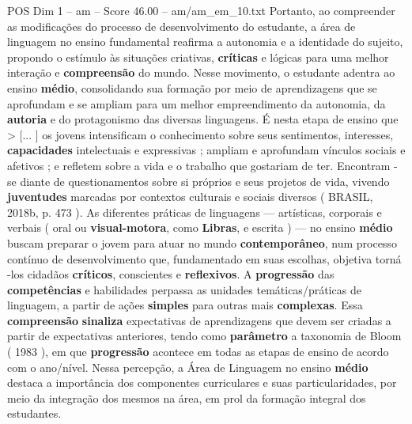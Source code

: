 \begin{textsample}{POS Dim 1 – am – Score 46.00 – am/am\_em\_10.txt}
Portanto, ao compreender as modificações do processo de desenvolvimento do estudante, a área de linguagem no ensino fundamental reafirma a autonomia e a identidade do sujeito, propondo o estímulo às situações criativas, \textbf{críticas} e lógicas para uma melhor interação e \textbf{compreensão} do mundo.
Nesse movimento, o estudante adentra ao ensino \textbf{médio}, consolidando sua formação por meio de aprendizagens que se aprofundam e se ampliam para um melhor empreendimento da autonomia, da \textbf{autoria} e do protagonismo das diversas linguagens.
É nesta etapa de ensino que > [... ] os jovens intensificam o conhecimento sobre seus sentimentos, interesses, \textbf{capacidades} intelectuais e expressivas ; ampliam e aprofundam vínculos sociais e afetivos ; e refletem sobre a vida e o trabalho que gostariam de ter.
Encontram -se diante de questionamentos sobre si próprios e seus projetos de vida, vivendo \textbf{juventudes} marcadas por contextos culturais e sociais diversos ( BRASIL, 2018b, p. 473 ).
As diferentes práticas de linguagens — artísticas, corporais e verbais ( oral ou \textbf{visual-motora}, como \textbf{Libras}, e escrita ) — no ensino \textbf{médio} buscam preparar o jovem para atuar no mundo \textbf{contemporâneo}, num processo contínuo de desenvolvimento que, fundamentado em suas escolhas, objetiva torná -los cidadãos \textbf{críticos}, conscientes e \textbf{reflexivos}.
A \textbf{progressão} das \textbf{competências} e habilidades perpassa as unidades temáticas/práticas de linguagem, a partir de ações \textbf{simples} para outras mais \textbf{complexas}.
Essa \textbf{compreensão} \textbf{sinaliza} expectativas de aprendizagens que devem ser criadas a partir de expectativas anteriores, tendo como \textbf{parâmetro} a taxonomia de Bloom ( 1983 ), em que \textbf{progressão} acontece em todas as etapas de ensino de acordo com o ano/nível.
Nessa percepção, a Área de Linguagem no ensino \textbf{médio} destaca a importância dos componentes curriculares e suas particularidades, por meio da integração dos mesmos na área, em prol da formação integral dos estudantes.

\end{textsample}
